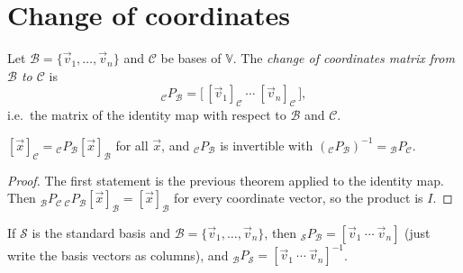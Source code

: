 \section{Change of coordinates}

\begin{definition}
Let $\mathcal B=\{\vec v_1,\dots,\vec v_n\}$ and $\mathcal C$ be bases of $\mathbb V$. The \emph{change of coordinates matrix
from $\mathcal B$ to $\mathcal C$} is
\[
  {}_{\mathcal C}P_{\mathcal B}=\Big[\,[\vec v_1]_{\mathcal C}\ \cdots\ [\vec v_n]_{\mathcal C}\,\Big],
\]
i.e.\ the matrix of the identity map with respect to $\mathcal B$ and $\mathcal C$.
\end{definition}

\begin{theorem}
$[\vec x]_{\mathcal C}={}_{\mathcal C}P_{\mathcal B}[\vec x]_{\mathcal B}$ for all $\vec x$, and ${}_{\mathcal C}P_{\mathcal B}$ is invertible with
$({}_{\mathcal C}P_{\mathcal B})^{-1}={}_{\mathcal B}P_{\mathcal C}$.
\end{theorem}
\begin{proof}
The first statement is the previous theorem applied to the identity map. Then
${}_{\mathcal B}P_{\mathcal C}\,{}_{\mathcal C}P_{\mathcal B}[\vec x]_{\mathcal B}=[\vec x]_{\mathcal B}$ for every coordinate vector, so the
product is $I$.
\end{proof}

\begin{important}[In $\R^n$]
If $\mathcal S$ is the standard basis and $\mathcal B=\{\vec v_1,\dots,\vec v_n\}$, then
${}_{\mathcal S}P_{\mathcal B}=[\vec v_1\ \cdots\ \vec v_n]$ (just write the basis vectors as columns), and
${}_{\mathcal B}P_{\mathcal S}=[\vec v_1\ \cdots\ \vec v_n]^{-1}$.
\end{important}


